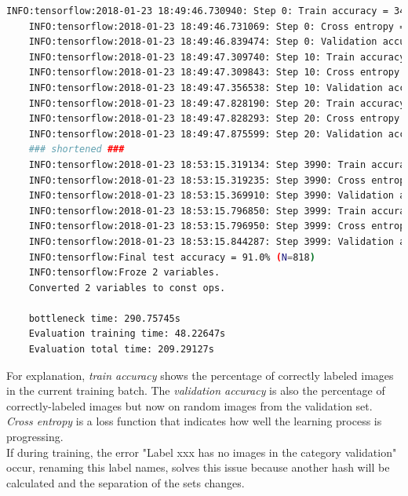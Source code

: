 \begin{minipage}{\linewidth}
\begin{lstlisting}[caption=Output of \textit{retrain.py}, label=list:training_hist, language=bash]
	INFO:tensorflow:2018-01-23 18:49:46.730940: Step 0: Train accuracy = 34.0%
	INFO:tensorflow:2018-01-23 18:49:46.731069: Step 0: Cross entropy = 4.808121
	INFO:tensorflow:2018-01-23 18:49:46.839474: Step 0: Validation accuracy = 4.0% 
	INFO:tensorflow:2018-01-23 18:49:47.309740: Step 10: Train accuracy = 27.0%
	INFO:tensorflow:2018-01-23 18:49:47.309843: Step 10: Cross entropy = 4.646721
	INFO:tensorflow:2018-01-23 18:49:47.356538: Step 10: Validation accuracy = 15.0%
	INFO:tensorflow:2018-01-23 18:49:47.828190: Step 20: Train accuracy = 50.0%
	INFO:tensorflow:2018-01-23 18:49:47.828293: Step 20: Cross entropy = 4.465392
	INFO:tensorflow:2018-01-23 18:49:47.875599: Step 20: Validation accuracy = 32.0%
	### shortened ###
	INFO:tensorflow:2018-01-23 18:53:15.319134: Step 3990: Train accuracy = 91.0%
	INFO:tensorflow:2018-01-23 18:53:15.319235: Step 3990: Cross entropy = 0.282067
	INFO:tensorflow:2018-01-23 18:53:15.369910: Step 3990: Validation accuracy = 89.0%
	INFO:tensorflow:2018-01-23 18:53:15.796850: Step 3999: Train accuracy = 96.0%
	INFO:tensorflow:2018-01-23 18:53:15.796950: Step 3999: Cross entropy = 0.204091
	INFO:tensorflow:2018-01-23 18:53:15.844287: Step 3999: Validation accuracy = 89.0% 
	INFO:tensorflow:Final test accuracy = 91.0% (N=818)
	INFO:tensorflow:Froze 2 variables.
	Converted 2 variables to const ops.
	
	bottleneck time: 290.75745s
	Evaluation training time: 48.22647s
	Evaluation total time: 209.29127s
\end{lstlisting}
\end{minipage}

For explanation, \textit{train accuracy} shows the percentage of correctly labeled images in the current training batch. The \textit{validation accuracy} is also the percentage of correctly-labeled images but now on random images from the validation set. \textit{Cross entropy} is a loss function that indicates how well the learning process is progressing. \citep{TensorFlowRetrain2017}\\

If during training, the error "Label xxx has no images in the category validation" occur, renaming this label names, solves this issue because another hash will be calculated and the separation of the sets changes. \\

